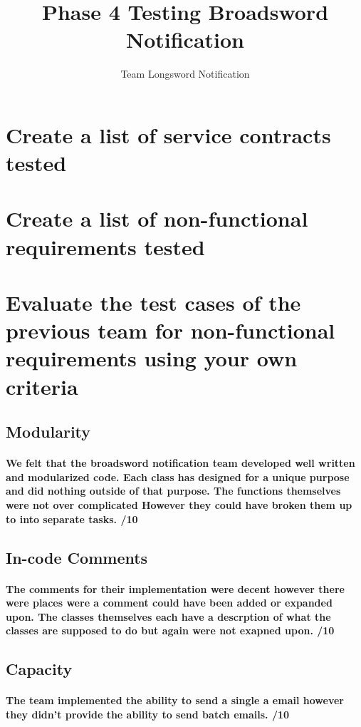 \documentclass[11pt]{article}
\author{Team Longsword Notification}
\title{Phase 4 Testing Broadsword Notification}
\begin{document}
	\setlength{\parskip}{6pt}
	
	
	
	\tableofcontents
	
	\newpage
	
	
	\section{Create a list of service contracts tested}
	\section{Create a list of non-functional requirements tested}
	\section{Evaluate the test cases of the previous team for non-functional requirements using your own criteria}	
		\subsection{Modularity}
			\paragraph{We felt that the broadsword notification team developed well written and modularized code. Each class has designed for a unique purpose and did nothing outside of that purpose. The functions themselves were not over complicated However they could have broken them up to into separate tasks.  /10}
		\subsection{In-code Comments}
			\paragraph{The comments for their implementation were decent however there were places were a comment could have been added or expanded upon. The classes themselves each have a descrption of what the classes are supposed to do but again were not exapned upon. /10}
		\subsection{Capacity}
			\paragraph{The team implemented the ability to send a single a email however they didn't provide the ability to send batch emails. /10}
\end{document}
